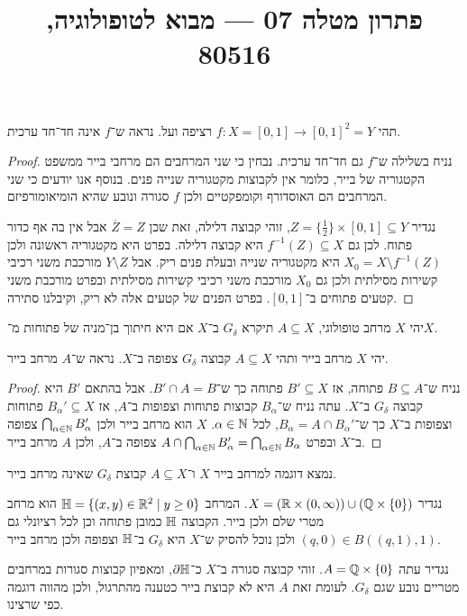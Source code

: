 
\title{פתרון מטלה 07 --- מבוא לטופולוגיה, 80516}


\maketitle
\maketitleprint[purple]

\question{}
תהי $f : X = [0, 1] \to {[0, 1]}^2 = Y$ רציפה ועל.
נראה ש־$f$ אינה חד־חד ערכית.
\begin{proof}
	נניח בשלילה ש־$f$ גם חד־חד ערכית.
	נבחין כי שני המרחבים הם מרחבי בייר ממשפט הקטגוריה של בייר, כלומר אין לקבוצות מקטגוריה שנייה פנים.
	בנוסף אנו יודעים כי שני המרחבים הם האוסדורף וקומפקטיים ולכן $f$ סגורה ונובע שהיא הומיאומורפיזם.

	נגדיר $Z = \{ \frac{1}{2} \} \times [0, 1] \subseteq Y$, זוהי קבוצה דלילה, זאת שכן $\overline{Z} = Z$ אבל אין בה אף כדור פתוח.
	לכן גם $f^{-1}(Z) \subseteq X$ היא קבוצה דלילה.
	בפרט היא מקטגוריה ראשונה ולכן $X_0 = X \setminus f^{-1}(Z)$ היא מקטגוריה שנייה ובעלת פנים ריק.
	אבל $Y \setminus Z$ מורכבת משני רכיבי קשירות מסילתית ולכן גם $X_0$ מורכבת משני רכיבי קשירות מסילתית ובפרט מורכבת משני קטעים פתוחים ב־$[0, 1]$.
	בפרט הפנים של קטעים אלה לא ריק, וקיבלנו סתירה.
\end{proof}

\question[3]
יהי $X$ מרחב טופולוגי,
$A \subseteq X$ תיקרא $G_{\delta}$ ב־$X$ אם היא חיתוך בן־מניה של פתוחות מ־$X$.

\subquestion{}
יהי $X$ מרחב בייר ותהי $A \subseteq X$ קבוצה $G_{\delta}$ צפופה ב־$X$.
נראה ש־$A$ מרחב בייר.
\begin{proof}
	נניח ש־$B \subseteq A$ פתוחה, אז $B' \subseteq X$ פתוחה כך ש־$B' \cap A = B$.
	אבל בהתאם $B'$ היא קבוצה $G_{\delta}$ ב־$X$.
	עתה נניח ש־$B_{\alpha}$ קבוצות פתוחות וצפופות ב־$A$, אז $B_{\alpha}' \subseteq X$ פתוחות וצפופות ב־$X$ כך ש־$B_{\alpha} = A \cap B_{\alpha}'$, לכל $\alpha \in \mathbb{N}$.
	$X$ הוא מרחב בייר ולכן $\bigcap_{\alpha \in \mathbb{N}} B_{\alpha}'$ צפופה ב־$X$ ובפרט $A \cap \bigcap_{\alpha \in \mathbb{N}} B_{\alpha}' = \bigcap_{\alpha \in \mathbb{N}} B_{\alpha}$ צפופה ב־$A$, ולכן $A$ מרחב בייר.
\end{proof}

\subquestion{}
נמצא דוגמה למרחב בייר $X$ ו־$A \subseteq X$ קבוצת $G_{\delta}$ שאינה מרחב בייר.
\begin{solution}
	נגדיר $X = (\mathbb{R} \times (0, \infty)) \cup (\mathbb{Q} \times \{0\})$.
	המרחב $\mathbb{H} = \{ (x, y) \in \mathbb{R}^2 \mid y \ge 0 \}$ הוא מרחב מטרי שלם ולכן בייר.
	הקבוצה $\mathbb{H}$ כמובן פתוחה וכן לכל רציונלי גם $(q, 0) \in B((q, 1), 1)$ ולכן נוכל להסיק ש־$X$ היא $G_{\delta}$ ב־$\mathbb{H}$ וצפופה ולכן מרחב בייר.

	נגדיר עתה $A = \mathbb{Q} \times \{ 0 \}$.
	זוהי קבוצה סגורה ב־$X$ כ־$\partial \mathbb{H}$, ומאפיון קבוצות סגורות במרחבים מטריים נובע שגם $G_{\delta}$.
	לעומת זאת $A$ היא לא קבוצת בייר כטענה מהתרגול, ולכן מהווה דוגמה כפי שרצינו.
\end{solution}

